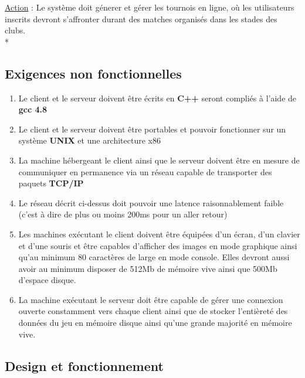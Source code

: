 \documentclass[a4paper]{article}
\begin{document}
\begin{description}[style=nextline]
			\item[Gérer les tournois :]
			\begin{description}[leftmargin=*] %
				\item[]
				\item \underline{Action} : Le système doit génerer et gérer les tournois en ligne, où les utilisateurs inscrits devront s'affronter durant des matches organisés dans les stades des clubs.\\*
			\end{description} %
			
		\end{description}

\subsection{Exigences non fonctionnelles}
\label{enf}
\begin{enumerate}
\item Le client et le serveur doivent être écrits en \textbf{C++} seront compliés à l'aide de \textbf{gcc 4.8}
\item Le client et le serveur doivent être portables et pouvoir fonctionner sur un système \textbf{UNIX} et une architecture x86
\item La machine hébergeant le client ainsi que le serveur doivent être en mesure de communiquer en permanence via un réseau capable de transporter des paquets \textbf{TCP/IP}
\item Le réseau décrit ci-dessus doit pouvoir une latence raisonnablement faible (c'est à dire de plus ou moins 200ms pour un aller retour)
\item Les machines exécutant le client doivent être équipées d'un écran, d'un clavier et d'une souris et être capables d'afficher des images en mode graphique ainsi qu'au minimum 80 caractères de large en mode console. Elles devront aussi avoir au minimum disposer de 512Mb de mémoire vive ainsi que 500Mb d'espace disque.
\item La machine exécutant le serveur doit être capable de gérer une connexion ouverte constamment vers chaque client ainsi que de stocker l'entièreté des données du jeu en mémoire disque ainsi qu'une grande majorité en mémoire vive.
\end{enumerate}

\subsection{Design et fonctionnement}
\end{document}
